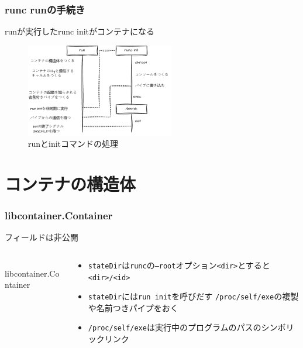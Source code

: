 \documentclass[unicode, 14pt, aspectratio=169]{beamer}
\begin{document}
\begin{frame}[t]
  \frametitle{runc runの手続き}
  runが実行したrunc initがコンテナになる
  \begin{figure}
    \centering
    \includegraphics[width=6.5cm]{images/images.drawio.pdf}
    \caption{runとinitコマンドの処理}
    \label{fig:fuga}
  \end{figure}
\end{frame}
\section{コンテナの構造体}
\begin{frame}[t]
  \frametitle{libcontainer.Container}
  フィールドは非公開
  \begin{columns}
    \begin{column}{0.5\textwidth}
      \begin{center}
        \inputminted{go}{code/container.go}
        libcontainer.Container\supercite{libcontainer}
      \end{center}
    \end{column}
    \begin{column}{0.5\textwidth}  %
      \begin{itemize}[leftmargin=0.2cm,label=$\circ$]
        \item \texttt{stateDir}は\texttt{runc}の\texttt{--root}オプション\texttt{<dir>}とすると\texttt{<dir>/<id>}
        \item \texttt{stateDir}には\texttt{run init}を呼びだす \texttt{/proc/self/exe}の複製や名前つきパイプをおく
        \item \texttt{/proc/self/exe}は実行中のプログラムのパスのシンボリックリンク
      \end{itemize}
    \end{column}
\end{columns}
\end{frame}
\end{document}
